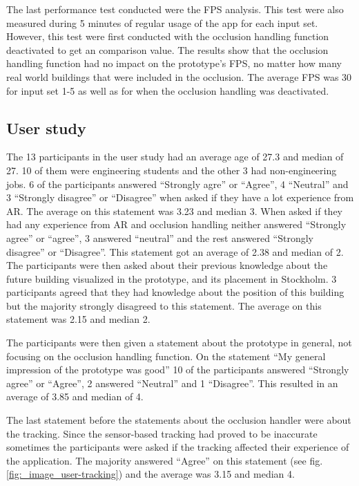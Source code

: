 The last performance test conducted were the FPS analysis. This test were also measured during 5 minutes of regular usage of the app for each input set. However, this test were first conducted with the occlusion handling function deactivated to get an comparison value. The results show that the occlusion handling function had no impact on the prototype's FPS, no matter how many real world buildings that were included in the occlusion. The average FPS was 30 for input set 1-5 as well as for when the occlusion handling was deactivated.

\subsection{User study}

The 13 participants in the user study had an average age of 27.3 and median of 27. 10 of them were engineering students and the other 3 had non-engineering jobs. 6 of the participants answered ``Strongly agre'' or ``Agree'', 4 ``Neutral'' and 3 ``Strongly disagree'' or ``Disagree'' when asked if they have a lot experience from AR. The average on this statement was 3.23 and median 3. When asked if they had any experience from AR and occlusion handling neither answered ``Strongly agree'' or ``agree'', 3 answered ``neutral'' and the rest answered ``Strongly disagree'' or ``Disagree''. This statement got an average of 2.38 and median of 2. The participants were then asked about their previous knowledge about the future building visualized in the prototype, and its placement in Stockholm. 3 participants agreed that they had knowledge about the position of this building but the majority strongly disagreed to this statement. The average on this statement was 2.15 and median 2.

The participants were then given a statement about the prototype in general, not focusing on the occlusion handling function. On the statement ``My general impression of the prototype was good'' 10 of the participants answered ``Strongly agree'' or ``Agree'', 2 answered ``Neutral'' and 1 ``Disagree''. This resulted in an average of 3.85 and median of 4. 

The last statement before the statements about the occlusion handler were about the tracking. Since the sensor-based tracking had proved to be inaccurate sometimes the participants were asked if the tracking affected their experience of the application. The majority answered ``Agree'' on this statement (see fig. \ref{fig:_image_user-tracking}) and the average was 3.15 and median 4.

